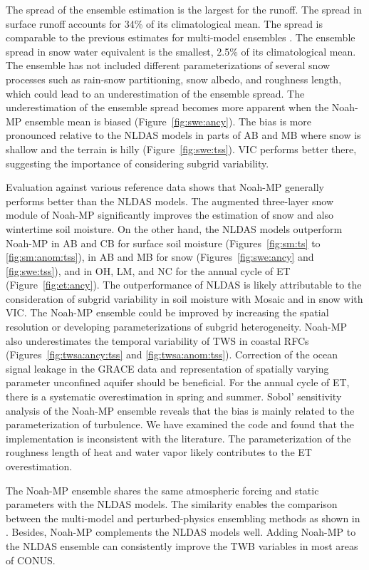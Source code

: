 \documentclass[essd, manuscript]{copernicus}
\begin{document}
The spread of the ensemble estimation is the largest for the runoff. The spread in surface runoff accounts for 34\% of its climatological mean. The spread is comparable to the previous estimates for multi-model ensembles \citep{dirmeyer2006BAMS}. The ensemble spread in snow water equivalent is the smallest, 2.5\% of its climatological mean. The ensemble has not included different parameterizations of several snow processes such as rain-snow partitioning, snow albedo, and roughness length, which could lead to an underestimation of the ensemble spread. The underestimation of the ensemble spread becomes more apparent when the Noah-MP ensemble mean is biased (Figure~\ref{fig:swe:ancy}). The bias is more pronounced relative to the NLDAS models in parts of AB and MB where snow is shallow and the terrain is hilly (Figure~\ref{fig:swe:tss}). VIC performs better there, suggesting the importance of considering subgrid variability.

Evaluation against various reference data shows that Noah-MP generally performs better than the NLDAS models. The augmented three-layer snow module of Noah-MP significantly improves the estimation of snow and also wintertime soil moisture. On the other hand, the NLDAS models outperform Noah-MP in AB and CB for surface soil moisture (Figures~\ref{fig:sm:ts} to \ref{fig:sm:anom:tss}), in AB and MB for snow (Figures~\ref{fig:swe:ancy} and \ref{fig:swe:tss}), and in OH, LM, and NC for the annual cycle of ET (Figure~\ref{fig:et:ancy}). The outperformance of NLDAS is likely attributable to the consideration of subgrid variability in soil moisture with Mosaic and in snow with VIC\@. The Noah-MP ensemble could be improved by increasing the spatial resolution or developing parameterizations of subgrid heterogeneity. Noah-MP also underestimates the temporal variability of TWS in coastal RFCs (Figures~\ref{fig:twsa:ancy:tss} and \ref{fig:twsa:anom:tss}). Correction of the ocean signal leakage in the GRACE data and representation of spatially varying parameter unconfined aquifer should be beneficial. For the annual cycle of ET, there is a systematic overestimation in spring and summer. Sobol' sensitivity analysis of the Noah-MP ensemble reveals that the bias is mainly related to the parameterization of turbulence. We have examined the code and found that the implementation is inconsistent with the literature. The parameterization of the roughness length of heat and water vapor likely contributes to the ET overestimation.

The Noah-MP ensemble shares the same atmospheric forcing and static parameters with the NLDAS models. The similarity enables the comparison between the multi-model and perturbed-physics ensembling methods as shown in \citet{fei2021WRR}. Besides, Noah-MP complements the NLDAS models well. Adding Noah-MP to the NLDAS ensemble can consistently improve the TWB variables in most areas of CONUS\@.
\end{document}
